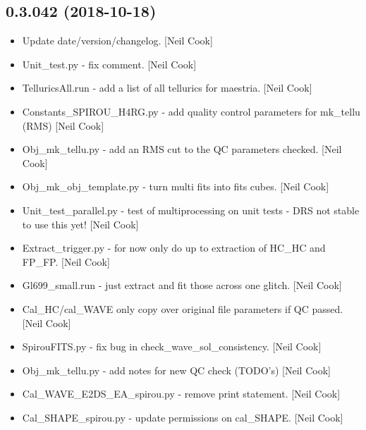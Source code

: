 \documentclass[a4paper,10pt,english]{report}
\begin{document}
\subsection{0.3.042 (2018-10-18)}
\label{\detokenize{misc/changelog:id287}}\begin{itemize}
\item {} 
Update date/version/changelog. {[}Neil Cook{]}

\item {} 
Unit\_test.py - fix comment. {[}Neil Cook{]}

\item {} 
TelluricsAll.run - add a list of all tellurics for maestria. {[}Neil
Cook{]}

\item {} 
Constants\_SPIROU\_H4RG.py - add quality control parameters for mk\_tellu
(RMS) {[}Neil Cook{]}

\item {} 
Obj\_mk\_tellu.py - add an RMS cut to the QC parameters checked. {[}Neil
Cook{]}

\item {} 
Obj\_mk\_obj\_template.py - turn multi fits into fits cubes. {[}Neil Cook{]}

\item {} 
Unit\_test\_parallel.py - test of multiprocessing on unit tests - DRS
not stable to use this yet! {[}Neil Cook{]}

\item {} 
Extract\_trigger.py - for now only do up to extraction of HC\_HC and
FP\_FP. {[}Neil Cook{]}

\item {} 
Gl699\_small.run - just extract and fit those across one glitch. {[}Neil
Cook{]}

\item {} 
Cal\_HC/cal\_WAVE only copy over original file parameters if QC passed.
{[}Neil Cook{]}

\item {} 
SpirouFITS.py - fix bug in check\_wave\_sol\_consistency. {[}Neil Cook{]}

\item {} 
Obj\_mk\_tellu.py - add notes for new QC check (TODO’s) {[}Neil Cook{]}

\item {} 
Cal\_WAVE\_E2DS\_EA\_spirou.py - remove print statement. {[}Neil Cook{]}

\item {} 
Cal\_SHAPE\_spirou.py - update permissions on cal\_SHAPE. {[}Neil Cook{]}


\end{itemize}
\end{document}
